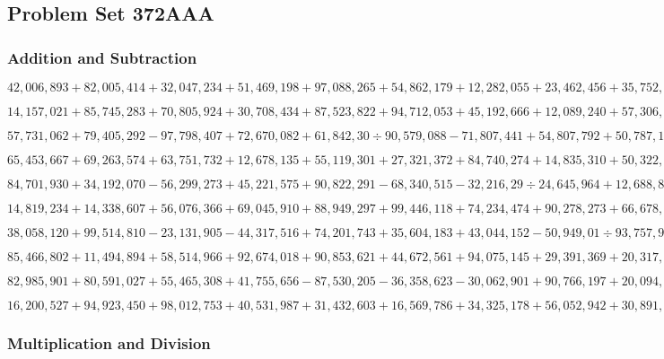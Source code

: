 \hypertarget{problem-set-372aaa}{%
\subsection{Problem Set 372AAA}\label{problem-set-372aaa}}

\hypertarget{addition-and-subtraction}{%
\subsubsection{Addition and
Subtraction}\label{addition-and-subtraction}}

\(42,006,893+82,005,414+32,047,234+51,469,198+97,088,265+54,862,179+12,282,055+23,462,456+35,752,691+76,106,182\)

\(14,157,021+85,745,283+70,805,924+30,708,434+87,523,822+94,712,053+45,192,666+12,089,240+57,306,702+38,091,605\)

\(57,731,062+79,405,292-97,798,407+72,670,082+61,842,30÷90,579,088-71,807,441+54,807,792+50,787,175-18,910,705\)

\(65,453,667+69,263,574+63,751,732+12,678,135+55,119,301+27,321,372+84,740,274+14,835,310+50,322,761+97,770,863\)

\(84,701,930+34,192,070-56,299,273+45,221,575+90,822,291-68,340,515-32,216,29÷24,645,964+12,688,835+44,216,675\)

\(14,819,234+14,338,607+56,076,366+69,045,910+88,949,297+99,446,118+74,234,474+90,278,273+66,678,149+24,464,123\)

\(38,058,120+99,514,810-23,131,905-44,317,516+74,201,743+35,604,183+43,044,152-50,949,01÷93,757,902+64,758,211\)

\(85,466,802+11,494,894+58,514,966+92,674,018+90,853,621+44,672,561+94,075,145+29,391,369+20,317,001+87,915,530\)

\(82,985,901+80,591,027+55,465,308+41,755,656-87,530,205-36,358,623-30,062,901+90,766,197+20,094,469-41,524,681\)

\(16,200,527+94,923,450+98,012,753+40,531,987+31,432,603+16,569,786+34,325,178+56,052,942+30,891,893+31,154,310\)

\hypertarget{multiplication-and-division}{%
\subsubsection{Multiplication and
Division}\label{multiplication-and-division}}

